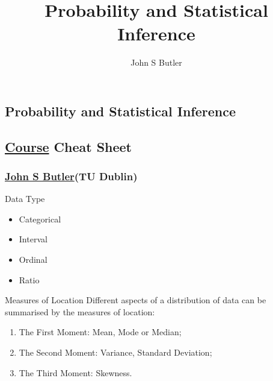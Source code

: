 \documentclass[10pt,a4paper]{article}
\title{Probability and Statistical Inference}
\author{John S Butler }
\begin{document}
\small
\begin{multicols}{3}

\scriptsize


\section*{Probability and Statistical Inference}
\subsection*{\href{https://sites.google.com/dit.ie/math4001
}{Course} Cheat Sheet}
\subsubsection*{\href{johnsbutler.netlify.com}{John S Butler}(TU Dublin) }

\begin{textbox}{Data Type}
\begin{multicols}{2}
\begin{itemize}
  \item Categorical
  \item Interval
  \item Ordinal
  \item Ratio
\end{itemize}

\end{multicols}

\end{textbox}


\begin{textbox}{Measures of Location}
Different aspects of a distribution of data can be summarised by the measures of location:
\begin{enumerate}
    \item The First Moment: Mean, Mode or Median;
    \item  The Second Moment: Variance, Standard Deviation;
    \item  The Third Moment: Skewness.
\end{enumerate}


\end{textbox}
\end{multicols}
\end{document}
